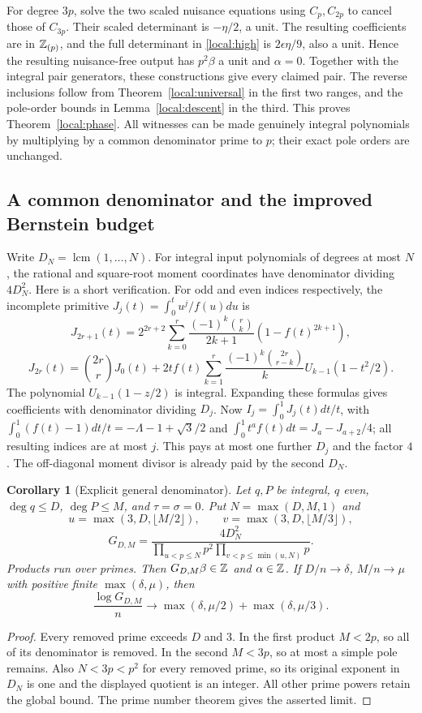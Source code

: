 \documentclass[11pt,a4paper]{article}
\numberwithin{equation}{section}
\newtheorem{corollary}[theorem]{Corollary}
\theoremstyle{definition}\newtheorem{definition}[theorem]{Definition}
\theoremstyle{remark}\newtheorem{remark}[theorem]{Remark}
\begin{document}
For degree $3p$, solve the two scaled nuisance equations using $C_p,C_{2p}$ to cancel those of $C_{3p}$. Their scaled determinant is $-\eta/2$, a unit. The resulting coefficients are in $\mathbb Z_{(p)}$, and the full determinant in \eqref{local:high} is $2\epsilon\eta/9$, also a unit. Hence the resulting nuisance-free output has $p^2\beta$ a unit and $\alpha=0$.
Together with the integral pair generators, these constructions give every claimed pair. The reverse inclusions follow from Theorem~\ref{local:universal} in the first two ranges, and the pole-order bounds in Lemma~\ref{local:descent} in the third. This proves Theorem~\ref{local:phase}.
All witnesses can be made genuinely integral polynomials by multiplying by a common denominator prime to $p$; their exact pole orders are unchanged.

\subsection{A common denominator and the improved Bernstein budget}
Write $D_N=\operatorname{lcm}(1,\ldots,N)$. For integral input polynomials of degrees at most $N$, the rational and square-root moment coordinates have denominator dividing $4D_N^2$. Here is a short verification. For odd and even indices respectively, the incomplete primitive $J_j(t)=\int_0^tu^j/f(u)du$ is
\[
 J_{2r+1}(t)=2^{2r+2}\sum_{k=0}^r\frac{(-1)^k\binom rk}{2k+1}(1-f(t)^{2k+1}),
\]
\[
 J_{2r}(t)=\binom{2r}rJ_0(t)+2tf(t)\sum_{k=1}^r\frac{(-1)^k\binom{2r}{r-k}}kU_{k-1}(1-t^2/2).
\]
The polynomial $U_{k-1}(1-z/2)$ is integral. Expanding these formulas gives coefficients with denominator dividing $D_j$. Now $I_j=\int_0^1J_j(t)dt/t$, with
$\int_0^1(f(t)-1)dt/t=-\Lambda-1+\sqrt3/2$ and
$\int_0^1t^a f(t)dt=J_a-J_{a+2}/4$; all resulting indices are at most $j$. This pays at most one further $D_j$ and the factor $4$. The off-diagonal moment divisor is already paid by the second $D_N$.

\begin{corollary}[Explicit general denominator]\label{local:denominator}
Let $q,P$ be integral, $q$ even, $\deg q\le D$, $\deg P\le M$, and $\tau=\sigma=0$. Put $N=\max(D,M,1)$ and
\[
 u=\max(3,D,\lfloor M/2\rfloor),\qquad v=\max(3,D,\lfloor M/3\rfloor),
\]
\[
 G_{D,M}=\frac{4D_N^2}{\displaystyle\prod_{u<p\le N}p^2\prod_{v<p\le\min(u,N)}p}.
\]
Products run over primes. Then $G_{D,M}\beta\in\mathbb Z$ and $\alpha\in\mathbb Z$. If $D/n\to\delta$, $M/n\to\mu$ with positive finite $\max(\delta,\mu)$, then
\[
 \frac{\log G_{D,M}}n\longrightarrow
                \max(\delta,\mu/2)+\max(\delta,\mu/3).
\]
\end{corollary}
\begin{proof}
Every removed prime exceeds $D$ and $3$. In the first product $M<2p$, so all of its denominator is removed. In the second $M<3p$, so at most a simple pole remains. Also $N<3p<p^2$ for every removed prime, so its original exponent in $D_N$ is one and the displayed quotient is an integer. All other prime powers retain the global bound. The prime number theorem gives the asserted limit.
\end{proof}
\end{document}
